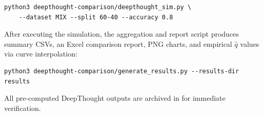 \begin{lstlisting}[style=shell]
python3 deepthought-comparison/deepthought_sim.py \
    --dataset MIX --split 60-40 --accuracy 0.8
\end{lstlisting}

\noindent After executing the simulation, the aggregation and report script produces summary CSVs, an Excel comparison report, PNG charts, and empirical $\hat{q}$ values via curve interpolation:

\begin{lstlisting}[style=shell]
python3 deepthought-comparison/generate_results.py --results-dir results
\end{lstlisting}

\noindent All pre-computed DeepThought outputs are archived in  for immediate verification.

